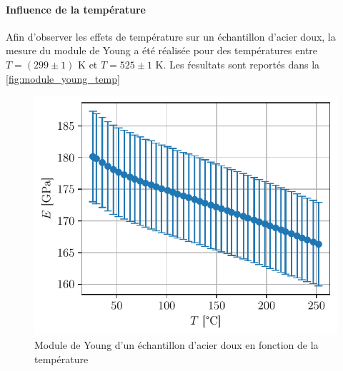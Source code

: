 \paragraph{Influence de la température} Afin d'observer les effets de température sur un échantillon d'acier doux, la mesure du module de Young a été réalisée pour des températures entre \(T = (299 \pm 1)\) \si{\kelvin} et \(T = 525 \pm 1\) \si{\kelvin}. Les ŕesultats sont reportés dans la \autoref{fig:module_young_temp}

\begin{figure}[h]
    \centering
    \includegraphics{figures/acier_doux_module_young_temp.pdf}
    \caption{Module de Young d'un échantillon d'acier doux en fonction de la température}
    \label{fig:module_young_temp}
\end{figure}